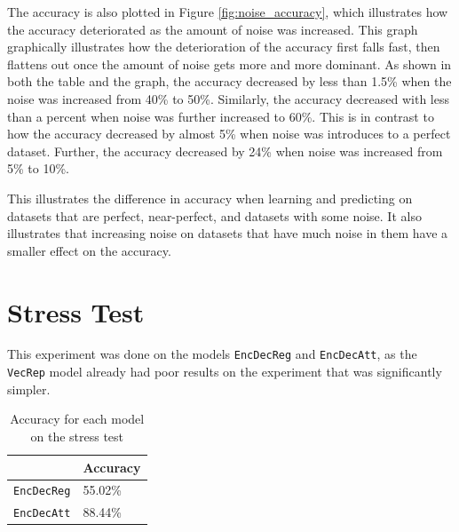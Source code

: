 The accuracy is also plotted in Figure \ref{fig:noise_accuracy}, which illustrates how the accuracy deteriorated as the amount of noise was increased. This graph graphically illustrates how the deterioration of the accuracy first falls fast, then flattens out once the amount of noise gets more and more dominant. As shown in both the table and the graph, the accuracy decreased by less than 1.5\% when the noise was increased from 40\% to 50\%. Similarly, the accuracy decreased with less than a percent when noise was further increased to 60\%. This is in contrast to how the accuracy decreased by almost 5\% when noise was introduces to a perfect dataset. Further, the accuracy decreased by 24\% when noise was increased from 5\% to 10\%.

This illustrates the difference in accuracy when learning and predicting on datasets that are perfect, near-perfect, and datasets with some noise. It also illustrates that increasing noise on datasets that have much noise in them have a smaller effect on the accuracy.


\section{Stress Test}
This experiment was done on the models {\tt EncDecReg} and {\tt EncDecAtt}, as the {\tt VecRep} model already had poor results on the experiment that was significantly simpler.

\begin{table}[H]
    \centering
    \begin{tabular}{|l|l|}
        \hline 
                                        & \textbf{Accuracy}         \\ \hline
        {\tt EncDecReg}                 & 55.02\%                   \\ \hline
        {\tt EncDecAtt}                 & 88.44\%                   \\ \hline
    \end{tabular}
    \caption{Accuracy for each model on the stress test}
    \label{table:accuracy_stress_test}
\end{table}

